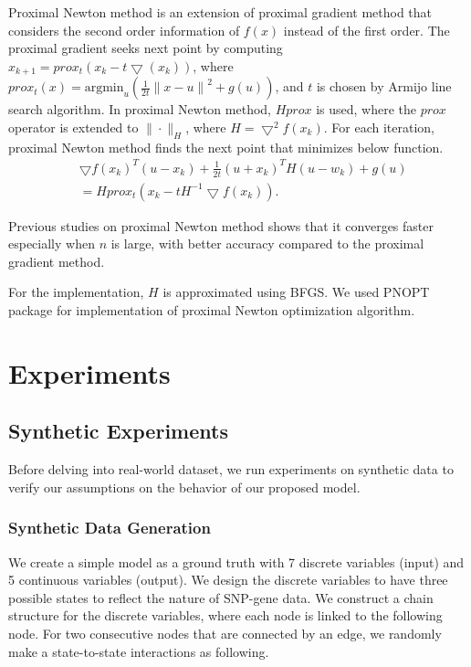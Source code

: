 \documentclass{article}
\begin{document}
Proximal Newton method is an extension of proximal gradient method that considers the second order information of $f(x)$ instead of the first order.
The proximal gradient seeks next point by computing $x_{k+1} = prox_t (x_k - t \bigtriangledown(x_k))$, where $prox_t(x)=\text{argmin}_u(\frac{1}{2t}{\|x-u\|}^2 + g(u))$, and $t$ is chosen by Armijo line search algorithm. In proximal Newton method, $Hprox$ is used, where the $prox$ operator is extended to $\| \cdot \|_H$, where $H=\bigtriangledown^2 f(x_k)$. For each iteration, proximal Newton method finds the next point that minimizes below function.
\begin{align}
  &\bigtriangledown f(x_k)^T(u-x_k)+\frac{1}{2t}(u+x_k)^TH(u-w_k)+g(u) \nonumber    \\
 & =  Hprox_t(x_k-tH^{-1}\bigtriangledown f(x_k)).
\end{align}

Previous studies on proximal Newton method \cite{lee2012proximal} shows that it converges faster especially when $n$ is large, with better accuracy compared to the proximal gradient method.

For the implementation, $H$ is approximated using BFGS.
We used PNOPT package \cite{lee2012proximal} for implementation of proximal Newton optimization algorithm.



\section{Experiments}


\subsection{Synthetic Experiments}
Before delving into real-world dataset, we run experiments on synthetic data to verify our assumptions on the behavior of our proposed model.


\subsubsection{Synthetic Data Generation}
We create a simple model as a ground truth with 7 discrete variables (input) and 5 continuous variables (output).
We design the discrete variables to have three possible states to reflect the nature of SNP-gene data. We construct a chain structure for the discrete variables, where each node is linked to the following node. For two consecutive nodes that are connected by an edge, we randomly make a state-to-state interactions as following.
\end{document}
